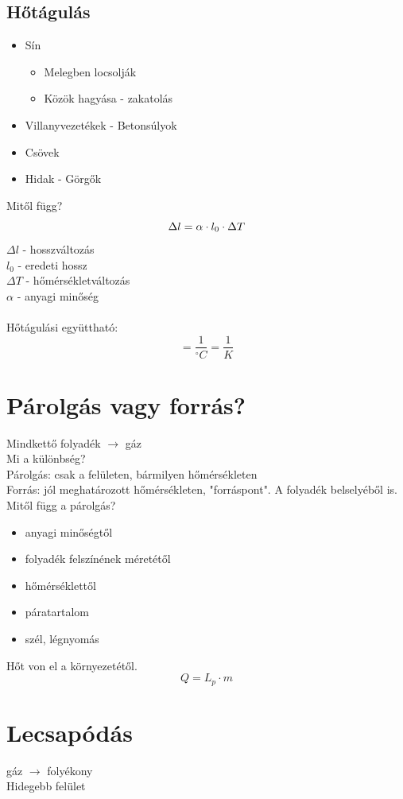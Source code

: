 \documentclass{article}
\theoremstyle{definition}
\begin{document}
\subsection{Hőtágulás}

\begin{itemize}
    \item Sín \begin{itemize}
        \item Melegben locsolják
        \item Közök hagyása - zakatolás
    \end{itemize}
    \item Villanyvezetékek - Betonsúlyok
    \item Csövek %
    \item Hidak - Görgők %
\end{itemize}

Mitől függ?
\begin{equation}
    \Delta l = \alpha \cdot l_{0} \cdot \Delta T \\
\end{equation}
$\Delta l$ - hosszváltozás \\
$l_{0}$ - eredeti hossz \\
$\Delta T$ - hőmérsékletváltozás \\
$\alpha$ - anyagi minőség\\ \\
Hőtágulási együttható:
\begin{equation}
    [\alpha]=\frac{1}{^{\circ}C} = \frac{1}{K}
\end{equation}



\section{Párolgás vagy forrás?}
Mindkettő folyadék $\rightarrow$ gáz\\
Mi a különbség?\\
Párolgás: csak a felületen, bármilyen hőmérsékleten\\
Forrás: jól meghatározott hőmérsékleten, "forráspont". A folyadék belselyéből is.
\\
Mitől függ a párolgás? 
\begin{itemize}
    \item anyagi minőségtől
    \item folyadék felszínének méretétől
    \item hőmérséklettől
    \item páratartalom
    \item szél, légnyomás
\end{itemize}

Hőt von el a környezetétől.
\[
Q = L_p \cdot m
\]

\section{Lecsapódás}
gáz $\rightarrow$ folyékony\\
Hidegebb felület
\end{document}
